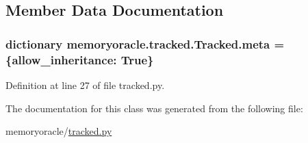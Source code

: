 \subsection{Member Data Documentation}
\hypertarget{classmemoryoracle_1_1tracked_1_1Tracked_a96c321cbc762ace556e0f3fb2650c707}{}
\subsubsection[{meta}]{\setlength{\rightskip}{0pt plus 5cm}dictionary memoryoracle.\+tracked.\+Tracked.\+meta = \{\textquotesingle{}allow\+\_\+inheritance\textquotesingle{}\+: True\}\hspace{0.3cm}{\ttfamily [static]}}\label{classmemoryoracle_1_1tracked_1_1Tracked_a96c321cbc762ace556e0f3fb2650c707}


Definition at line 27 of file tracked.\+py.



The documentation for this class was generated from the following file\+:\begin{DoxyCompactItemize}
\item 
memoryoracle/\hyperlink{tracked_8py}{tracked.\+py}\end{DoxyCompactItemize}
